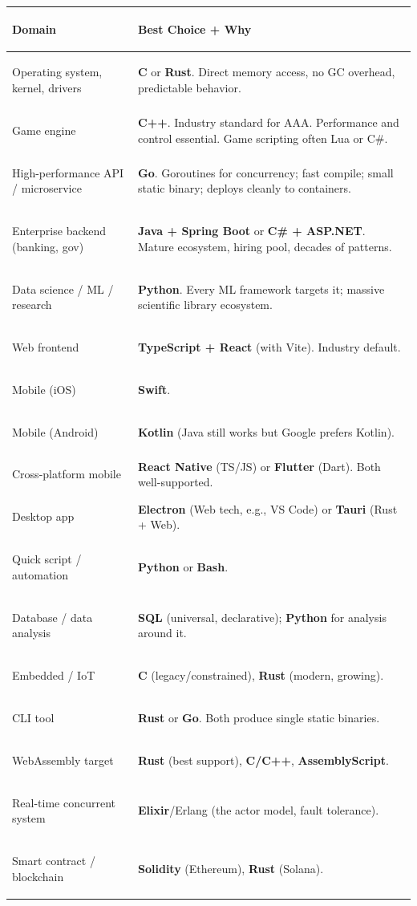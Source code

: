 \documentclass[11pt, letterpaper]{article}
\begin{document}
\noindent
{\small\renewcommand{\arraystretch}{1.6}
\begin{tabularx}{\textwidth}{>{\bfseries\raggedright\arraybackslash}p{4cm}
                              >{\raggedright\arraybackslash}X}
\toprule
\rowcolor{tableheader}
\textbf{Domain} & \textbf{Best Choice + Why} \\
\midrule
\rowcolor{rowB} Operating system, kernel, drivers   & \textbf{C} or \textbf{Rust}. Direct memory access, no GC overhead, predictable behavior. \\
\rowcolor{rowA} Game engine                          & \textbf{C++}. Industry standard for AAA. Performance and control essential. Game scripting often Lua or C\#. \\
\rowcolor{rowB} High-performance API / microservice  & \textbf{Go}. Goroutines for concurrency; fast compile; small static binary; deploys cleanly to containers. \\
\rowcolor{rowA} Enterprise backend (banking, gov)   & \textbf{Java + Spring Boot} or \textbf{C\# + ASP.NET}. Mature ecosystem, hiring pool, decades of patterns. \\
\rowcolor{rowB} Data science / ML / research        & \textbf{Python}. Every ML framework targets it; massive scientific library ecosystem. \\
\rowcolor{rowA} Web frontend                         & \textbf{TypeScript + React} (with Vite). Industry default. \\
\rowcolor{rowB} Mobile (iOS)                         & \textbf{Swift}. \\
\rowcolor{rowA} Mobile (Android)                     & \textbf{Kotlin} (Java still works but Google prefers Kotlin). \\
\rowcolor{rowB} Cross-platform mobile                 & \textbf{React Native} (TS/JS) or \textbf{Flutter} (Dart). Both well-supported. \\
\rowcolor{rowA} Desktop app                          & \textbf{Electron} (Web tech, e.g., VS Code) or \textbf{Tauri} (Rust + Web). \\
\rowcolor{rowB} Quick script / automation             & \textbf{Python} or \textbf{Bash}. \\
\rowcolor{rowA} Database / data analysis             & \textbf{SQL} (universal, declarative); \textbf{Python} for analysis around it. \\
\rowcolor{rowB} Embedded / IoT                       & \textbf{C} (legacy/constrained), \textbf{Rust} (modern, growing). \\
\rowcolor{rowA} CLI tool                             & \textbf{Rust} or \textbf{Go}. Both produce single static binaries. \\
\rowcolor{rowB} WebAssembly target                    & \textbf{Rust} (best support), \textbf{C/C++}, \textbf{AssemblyScript}. \\
\rowcolor{rowA} Real-time concurrent system          & \textbf{Elixir}/Erlang (the actor model, fault tolerance). \\
\rowcolor{rowB} Smart contract / blockchain          & \textbf{Solidity} (Ethereum), \textbf{Rust} (Solana). \\
\bottomrule
\end{tabularx}}
\end{document}
